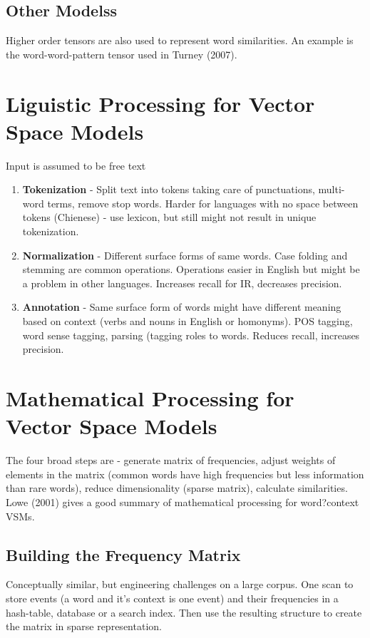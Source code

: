 \documentclass{article}
\begin{document}
\subsection{Other Modelss}
Higher order tensors are also used to represent word similarities. An example is the word-word-pattern tensor used in Turney (2007).

\section{Liguistic Processing for Vector Space Models}
Input is assumed to be free text
\begin{enumerate}
\item \textbf{Tokenization} - Split text into tokens taking care of punctuations, multi-word terms, remove stop words. Harder for languages with no space between tokens (Chienese) - use lexicon, but still might not result in unique tokenization.
\item \textbf{Normalization} - Different surface forms of same words. Case folding and stemming are common operations. Operations easier in English but might be a problem in other languages. Increases recall for IR, decreases precision.
\item \textbf{Annotation} - Same surface form of words might have different meaning based on context (verbs and nouns in English or homonyms). POS tagging, word sense tagging, parsing (tagging roles to words. Reduces recall, increases precision.
\end{enumerate}

\section{Mathematical Processing for Vector Space Models}
The four broad steps are - generate matrix of frequencies, adjust weights of elements in the matrix (common words have high frequencies but less information than rare words), reduce dimensionality (sparse matrix), calculate similarities. Lowe (2001) gives a good summary of mathematical processing for word?context VSMs.

\subsection{Building the Frequency Matrix}
Conceptually similar, but engineering challenges on a large corpus. One scan to store events (a word and it's context is one event) and their frequencies in a hash-table, database or a search index. Then use the resulting structure to create the matrix in sparse representation.
\end{document}
